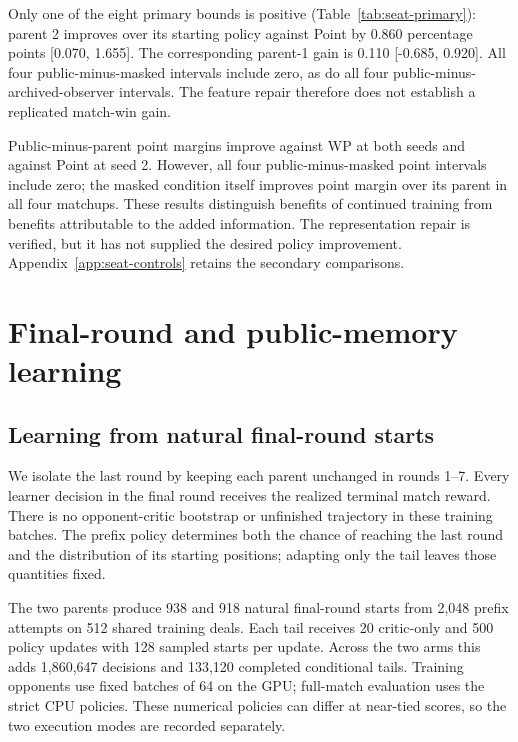 \documentclass[11pt]{article}
\begin{document}
Only one of the eight primary bounds is positive
(Table~\ref{tab:seat-primary}): parent 2 improves over its starting policy
against Point by 0.860 percentage points [0.070, 1.655]. The corresponding
parent-1 gain is 0.110 [-0.685, 0.920]. All four public-minus-masked intervals
include zero, as do all four public-minus-archived-observer intervals. The
feature repair therefore does not establish a replicated match-win gain.

\begin{table}[ht]
\centering\small

\caption{Public-seat comparison: paired changes in draw-adjusted win score,
in percentage points, with 95\% intervals.}
\label{tab:seat-primary}
\end{table}

Public-minus-parent point margins improve against WP at both seeds and against
Point at seed 2. However, all four public-minus-masked point intervals include
zero; the masked condition itself improves point margin over its parent in all
four matchups. These results distinguish benefits of continued training from
benefits attributable to the added information. The representation repair is
verified, but it has not supplied the desired policy improvement.
Appendix~\ref{app:seat-controls} retains the secondary comparisons.

\section{Final-round and public-memory learning}
\label{app:memory-learning}
\subsection{Learning from natural final-round starts}
We isolate the last round by keeping each parent unchanged in rounds 1--7.
Every learner decision in the final round receives the realized terminal
match reward. There is no opponent-critic bootstrap or unfinished trajectory
in these training batches. The prefix policy determines both the chance of
reaching the last round and the distribution of its starting positions;
adapting only the tail leaves those quantities fixed.

The two parents produce 938 and 918 natural final-round starts from 2,048
prefix attempts on 512 shared training deals. Each tail receives 20 critic-only
and 500 policy updates with 128 sampled starts per update. Across the two
arms this adds 1,860,647 decisions and 133,120 completed conditional tails.
Training opponents use fixed batches of 64 on the GPU; full-match evaluation
uses the strict CPU policies. These numerical policies can differ at near-tied
scores, so the two execution modes are recorded separately.
\end{document}
